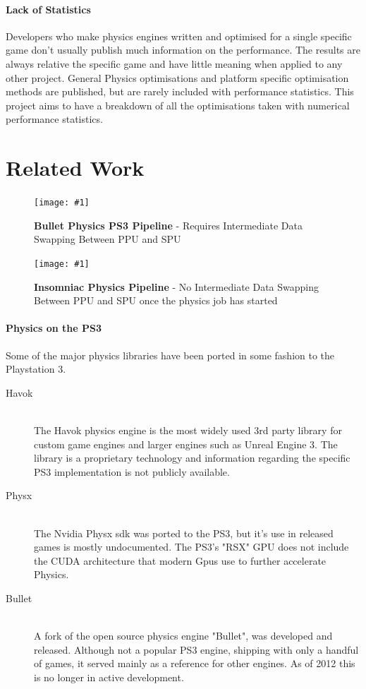 \documentclass[conference]{acmsiggraph}
\newcommand{\figuremacroF}[4]{
	\begin{figure}[h] %
		\centering
		\texttt{[image: \#1]}
		\caption[#2]{\textbf{#2} - #3}
		\label{fig:#1}
	\end{figure}
}
\begin{document}
\paragraph{Lack of Statistics}
Developers who make physics engines written and optimised for a single specific game don't usually publish much information on the performance. The results are always relative the specific game and have little meaning when applied to any other project. General Physics optimisations and platform specific optimisation methods are published, but are rarely included with performance statistics. This project aims to have a breakdown of all the optimisations taken with numerical performance statistics.

\section{Related Work}

\figuremacroF
{bullet}
{Bullet Physics PS3 Pipeline}
{Requires Intermediate Data Swapping Between PPU and SPU \protect\cite{spuphys}}
{0.96}
\figuremacroF
{insomniac}
{Insomniac Physics Pipeline}
{No Intermediate Data Swapping Between PPU and SPU once the physics job has started \protect\cite{spuphys}}
{0.96}

\paragraph{Physics on the PS3}
Some of the major physics libraries have been ported in some fashion to the Playstation 3.
\begin{description}
  \item[Havok] \hfill \\
   The Havok physics engine is the most widely used 3rd party library for custom game engines and larger engines such as Unreal Engine 3. The library is a proprietary  technology and information regarding the specific PS3 implementation is not publicly available.
  \item[Physx] \hfill \\
  The Nvidia Physx sdk was ported to the PS3, but it's use in released games is mostly undocumented. The PS3's "RSX" GPU does not include the CUDA architecture that modern Gpus use to further accelerate Physics.
  \item[Bullet] \hfill \\
  A fork of the open source physics engine "Bullet", was developed and released. Although not a popular PS3 engine, shipping with only a handful of games, it served mainly as a reference for other engines. As of 2012 this is no longer in active development.
\end{description}
\end{document}
